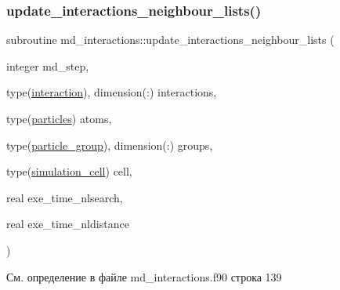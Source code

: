 \subsubsection{\texorpdfstring{update\+\_\+interactions\+\_\+neighbour\+\_\+lists()}{update\_interactions\_neighbour\_lists()}}
{\footnotesize\ttfamily subroutine md\+\_\+interactions\+::update\+\_\+interactions\+\_\+neighbour\+\_\+lists (\begin{DoxyParamCaption}\item[{integer}]{md\+\_\+step,  }\item[{type(\mbox{\hyperlink{structmd__interactions_1_1interaction}{interaction}}), dimension(\+:)}]{interactions,  }\item[{type(\mbox{\hyperlink{structmd__general_1_1particles}{particles}})}]{atoms,  }\item[{type(\mbox{\hyperlink{structmd__general_1_1particle__group}{particle\+\_\+group}}), dimension(\+:)}]{groups,  }\item[{type(\mbox{\hyperlink{structmd__general_1_1simulation__cell}{simulation\+\_\+cell}})}]{cell,  }\item[{real}]{exe\+\_\+time\+\_\+nlsearch,  }\item[{real}]{exe\+\_\+time\+\_\+nldistance }\end{DoxyParamCaption})}



См. определение в файле md\+\_\+interactions.\+f90 строка 139


